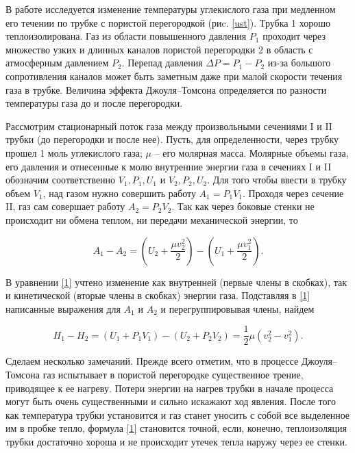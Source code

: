 \documentclass[a4paper,12pt]{article} %
\begin{document}
В работе исследуется изменение температуры углекислого газа при медленном его течении по трубке с пористой перегородкой (риc. \ref{ust}). Трубка 1 хорошо теплоизолирована. Газ из области повышенного давления $ P_1 $ проходит через множество узких и длинных каналов пористой перегородки 2 в область с атмосферным давлением $ P_2 $. Перепад давления $ \Delta P = P_1 - P_2 $ из-за большого сопротивления каналов может быть заметным даже при малой скорости течения газа в трубке. Величина эффекта Джоуля–Томсона определяется по разности температуры газа до и после перегородки.

Рассмотрим стационарный поток газа между произвольными сечениями I и II трубки (до перегородки и после нее). Пусть, для определенности, через трубку прошел 1 моль углекислого газа; $ \mu $ -- его молярная масса. Молярные объемы газа, его давления и отнесенные к молю внутренние энергии газа в сечениях I и II обозначим соответственно $ V_1, P_1, U_1 $ и $ V_2, P_2, U_2 $. Для того чтобы ввести в трубку объем $ V_1 $, над газом нужно совершить работу $ A_1 = P_1V_1 $. Проходя через сечение II, газ сам совершает работу $ A_2 = P_2V_2 $. Так как через боковые стенки не происходит ни обмена теплом, ни передачи механической энергии, то

\begin{equation}\label{1}
A_1-A_2=\left(U_2+\frac{\mu v_2^2}{2}\right) - \left(U_1 + \frac{\mu v_1^2}{2}\right).
\end{equation}

В уравнении \eqref{1} учтено изменение как внутренней (первые члены в скобках), так и кинетической (вторые члены в скобках) энергии газа. Подставляя в \eqref{1} написанные выражения для $ A_1 $ и $ A_2 $ и перегруппировывая члены, найдем

\begin{equation}\label{2}
H_1-H_2=\left(U_1+P_1V_1\right) - \left(U_2 + P_2V_2\right) = \frac{1}{2} \mu \left(v^2_2-v^2_1\right).
\end{equation}

Сделаем несколько замечаний. Прежде всего отметим, что в процессе Джоуля–Томсона газ испытывает в пористой перегородке существенное трение, приводящее к ее нагреву. Потери энергии на нагрев трубки в начале процесса могут быть очень существенными и сильно искажают ход явления. После того как температура трубки установится и газ станет уносить с собой все выделенное им в пробке тепло, формула \eqref{1} становится точной, если, конечно, теплоизоляция трубки достаточно хороша и не происходит утечек тепла наружу через ее стенки.
\end{document}
